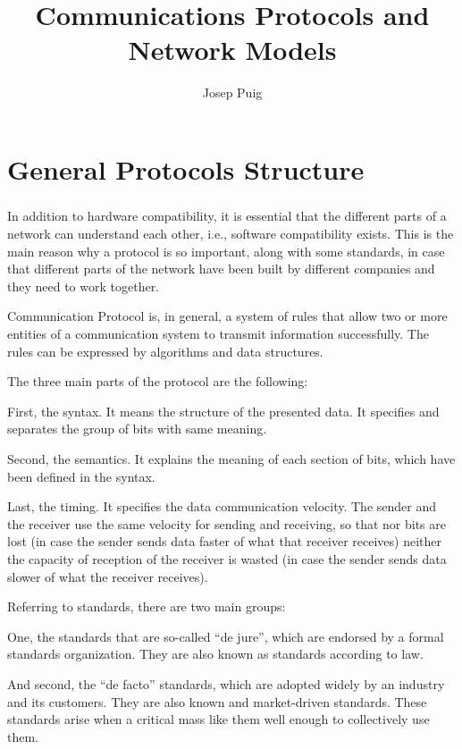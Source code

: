 \documentclass[12pt,a4paper]{report}
\author{Josep Puig}
\title{Communications Protocols and Network Models}
\begin{document}
\maketitle


\chapter{General Protocols Structure}

\paragraph{}

In addition to hardware compatibility, it is essential that the different parts of a network can understand each other, i.e., software compatibility exists. This is the main reason why a protocol is so important, along with some standards, in case that different parts of the network have been built by different companies and they need to work together. 

Communication Protocol is, in general, a system of rules that allow two or more entities of a communication system to transmit information successfully. The rules can be expressed by algorithms and data structures.

The three main parts of the protocol are the following:

First, the syntax. It means the structure of the presented data. It specifies and separates the group of bits with same meaning.

Second, the semantics. It explains the meaning of each section of bits, which have been defined in the syntax. 

Last, the timing. It specifies the data communication velocity. The sender and the receiver use the same velocity for sending and receiving, so that nor bits are lost (in case the sender sends data faster of what that receiver receives) neither the capacity of reception of the receiver is wasted (in case the sender sends data slower of what the receiver receives).

Referring to standards, there are two main groups:

One, the standards that are so-called “de jure”, which are endorsed by a formal standards organization. They are also known as standards according to law.

And second, the “de facto” standards, which are adopted widely by an industry and its customers. They are also known and market-driven standards. These standards arise when a critical mass like them well enough to collectively use them. 
\end{document}
